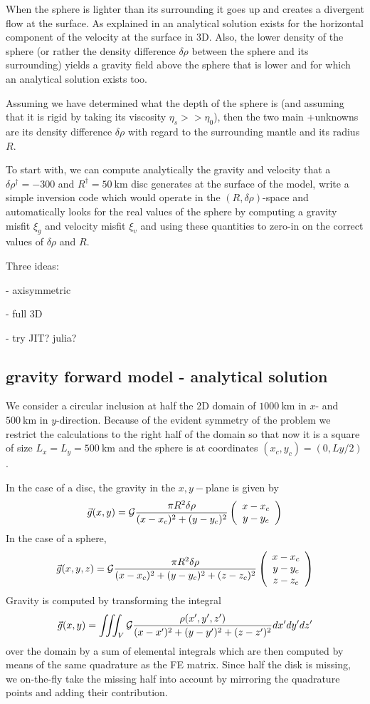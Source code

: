 When the sphere is lighter than its surrounding it goes up and creates a 
divergent flow at the surface. As explained in \textcite{bakp14} an analytical 
solution exists for the horizontal component of the velocity at the surface in 3D. 
Also, the lower density of the sphere (or rather the density difference $\delta\rho$
between the sphere and its surrounding) yields a gravity field 
above the sphere that is lower and for which an analytical solution exists too.

Assuming we have determined what the depth of the sphere is (and assuming that 
it is rigid by taking its viscosity $\eta_s >> \eta_0$), then the two main 
+unknowns are its density difference $\delta \rho$ with regard to the surrounding mantle
and its radius $R$. 

To start with, we can compute analytically the gravity and velocity that a 
$\delta\rho^\dag=-300$ and $R^\dag=50~\si{\km}$ disc generates at the surface of the model,
write a simple inversion code which would operate in the $(R,\delta\rho)$-space 
and automatically looks for the real values of the sphere by computing a gravity misfit $\xi_g$ 
and velocity misfit $\xi_v$ and using these quantities to zero-in on the correct values 
of $\delta \rho$ and $R$.


Three ideas:

- axisymmetric

- full 3D

- try JIT? julia?


\subsection*{gravity forward model - analytical solution}

We consider a circular inclusion at half the 2D domain of 
$1000~\si{\km}$ in $x$- and $500~\si{\km}$ in $y$-direction. 
Because of the evident symmetry of the problem we restrict the 
calculations to the right half of the domain so that now it 
is a square of size $L_x=L_y=500~\si{\km}$ and the sphere is 
at coordinates $(x_c,y_c)=(0,Ly/2)$.

In the case of a disc, the gravity in the $x,y-$plane is given by 
\[
\vec{g}(x,y) = {\cal G} \frac{\pi R^2 \delta\rho}{(x-x_c)^2+(y-y_c)^2} 
\left(
\begin{array}{c}
x-x_c \\
y-y_c
\end{array}
\right)
\]
In the case of a sphere, 
\[
\vec{g}(x,y,z) = {\cal G} \frac{\pi R^2 \delta\rho}{(x-x_c)^2+(y-y_c)^2+(z-z_c)^2} 
\left(
\begin{array}{c}
x-x_c \\
y-y_c \\
z-z_c 
\end{array}
\right)
\]
Gravity is computed by transforming the integral 
\[
\vec{g}(x,y) = \iiint_V {\cal G} \frac{\rho(x',y',z')}{ (x-x')^2+(y-y')^2+(z-z')^2    } dx'dy'dz'
\]
over the domain by a sum of elemental 
integrals which are then computed by means of the same quadrature as the FE matrix. 
Since half the disk is missing, we on-the-fly take the missing half into account by 
mirroring the quadrature points and adding their contribution. 

